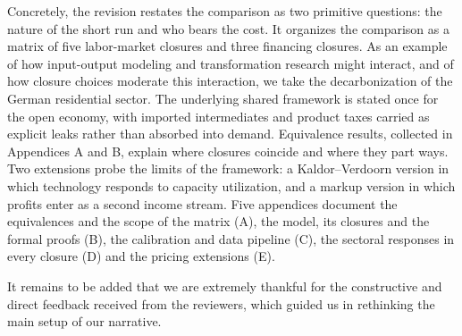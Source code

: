 Concretely, the revision restates the comparison as two primitive questions:
the nature of the short run and who bears the cost. It organizes the comparison
as a matrix of five labor-market closures and three financing closures. As an
example of how input-output modeling and transformation research might interact,
and of how closure choices moderate this interaction, we take the decarbonization
of the German residential sector. The underlying shared framework is stated once for the open economy, with imported intermediates and product taxes carried as explicit leaks rather than absorbed into demand. Equivalence results, collected in Appendices A and B, explain where closures coincide and where they part ways. Two extensions probe the limits of the framework: a Kaldor--Verdoorn version in which technology responds to capacity utilization, and a markup version in which profits enter as a second income stream. Five appendices document the equivalences and the scope of the matrix (A), the model, its closures and the formal proofs (B), the calibration and data pipeline (C), the sectoral responses in every closure (D) and the pricing extensions (E).

It remains to be added that we are extremely thankful for the constructive and direct
feedback received from the reviewers, which guided us in rethinking the main
setup of our narrative.


